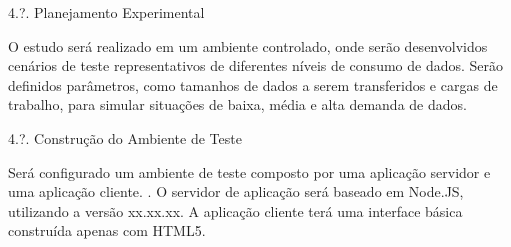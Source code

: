\documentclass[12pt]{article}
\begin{document}
4.?. Planejamento Experimental

O estudo será realizado em um ambiente controlado, onde serão desenvolvidos cenários de teste representativos de diferentes 
níveis de consumo de dados. Serão definidos parâmetros, como tamanhos de dados a serem transferidos e cargas 
de trabalho, para simular situações de baixa, média e alta demanda de dados.

4.?. Construção do Ambiente de Teste

Será configurado um ambiente de teste composto por uma aplicação servidor e uma aplicação cliente. . 
O servidor de aplicação será baseado em Node.JS, utilizando a versão xx.xx.xx. 
A aplicação cliente terá uma interface básica construída apenas com HTML5.






\end{document}
